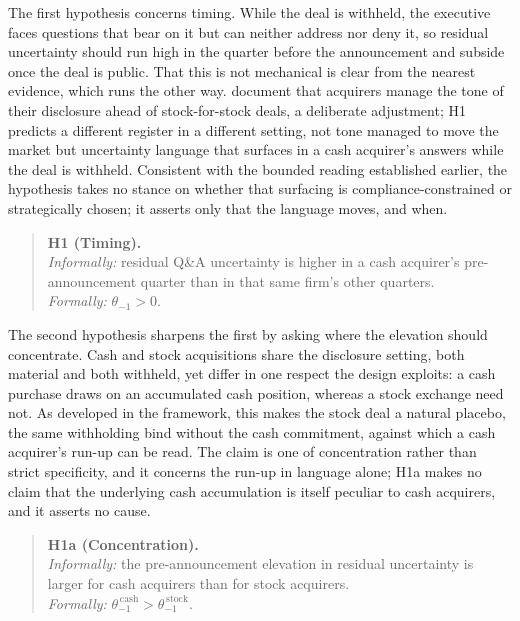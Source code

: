 The first hypothesis concerns timing. While the deal is withheld, the executive faces questions that bear on it but can neither address nor deny it, so residual uncertainty should run high in the quarter before the announcement and subside once the deal is public. That this is not mechanical is clear from the nearest evidence, which runs the other way. \citet{thewissen2024} document that acquirers manage the tone of their disclosure ahead of stock-for-stock deals, a deliberate adjustment; H1 predicts a different register in a different setting, not tone managed to move the market but uncertainty language that surfaces in a cash acquirer's answers while the deal is withheld. Consistent with the bounded reading established earlier, the hypothesis takes no stance on whether that surfacing is compliance-constrained or strategically chosen; it asserts only that the language moves, and when.
\begin{quote}
\textbf{H1 (Timing).}\\
\emph{Informally:} residual Q\&A uncertainty is higher in a cash acquirer's pre-announcement quarter than in that same firm's other quarters.\\
\emph{Formally:} $\theta_{-1}>0$.
\end{quote}

The second hypothesis sharpens the first by asking where the elevation should concentrate. Cash and stock acquisitions share the disclosure setting, both material and both withheld, yet differ in one respect the design exploits: a cash purchase draws on an accumulated cash position, whereas a stock exchange need not. As developed in the framework, this makes the stock deal a natural placebo, the same withholding bind without the cash commitment, against which a cash acquirer's run-up can be read. The claim is one of concentration rather than strict specificity, and it concerns the run-up in language alone; H1a makes no claim that the underlying cash accumulation is itself peculiar to cash acquirers, and it asserts no cause.
\begin{quote}
\textbf{H1a (Concentration).}\\
\emph{Informally:} the pre-announcement elevation in residual uncertainty is larger for cash acquirers than for stock acquirers.\\
\emph{Formally:} $\theta_{-1}^{\,\mathrm{cash}}>\theta_{-1}^{\,\mathrm{stock}}$.
\end{quote}

